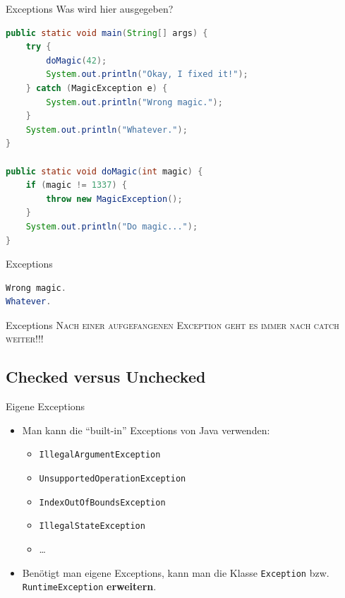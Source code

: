\documentclass[18pt]{beamer}
\newcommand{\quotes}[1]{``#1''}
\begin{document}
\begin{frame}[fragile]{Exceptions}
    Was wird hier ausgegeben?
    \begin{exampleblock}{}
        \begin{lstlisting}[language=Java,basicstyle=\scriptsize]
public static void main(String[] args) {
    try {
        doMagic(42);
        System.out.println("Okay, I fixed it!");
    } catch (MagicException e) {
        System.out.println("Wrong magic.");
    }
    System.out.println("Whatever.");
}

public static void doMagic(int magic) {
    if (magic != 1337) {
        throw new MagicException();
    }
    System.out.println("Do magic...");
}
        \end{lstlisting}

    \end{exampleblock}

\end{frame}

\begin{frame}[fragile]{Exceptions}
    \begin{exampleblock}{}
        \begin{lstlisting}[language=Java]
Wrong magic.
Whatever.
        \end{lstlisting}

    \end{exampleblock}

\end{frame}

\begin{frame}{Exceptions}
    \alert{\huge{\textsc{Nach einer aufgefangenen Exception geht es immer nach catch weiter!!!}}}
\end{frame}

\subsection{Checked versus Unchecked}


\begin{frame}{Eigene Exceptions}
    \begin{itemize}
        \item Man kann die \quotes{built-in} Exceptions von Java verwenden:
        \begin{itemize}
            \item \texttt{IllegalArgumentException}
            \item \texttt{UnsupportedOperationException}
            \item \texttt{IndexOutOfBoundsException}
            \item \texttt{IllegalStateException}
            \item \dots
        \end{itemize}
        \vspace{.2in}
        \item Benötigt man eigene Exceptions, kann man die Klasse \texttt{Exception} bzw. \texttt{RuntimeException} \textbf{erweitern}.
    \end{itemize}

\end{frame}
\end{document}
